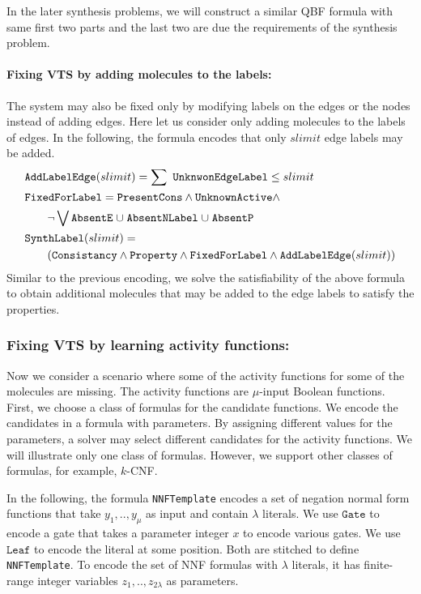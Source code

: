 In the later synthesis problems, we will construct a similar QBF
formula with same first two parts and the last two are due the
requirements of the synthesis problem.

\paragraph{\bf Fixing VTS by adding molecules to the labels:}
The system may also be fixed only by modifying labels on the edges or the nodes instead
of adding edges.
%
Here let us consider only adding molecules to the labels of edges.
%
In the following, the formula encodes that only $slimit$ edge labels may be added.
\begin{align*}
&\texttt{AddLabelEdge}(slimit) = 
\sum~\texttt{UnknwonEdgeLabel}  \leq slimit\\
& \texttt{FixedForLabel} = \texttt{PresentCons} \land \texttt{UnknownActive} \land\\
& \quad \quad \lnot \bigvee \texttt{AbsentE} \;{\cup}\;
\texttt{AbsentNLabel} \;{\cup}\;
\texttt{AbsentP}\\
&\texttt{SynthLabel}(slimit) = \\
& \quad\quad
(  \texttt{Consistancy}\land \texttt{Property} \land
\texttt{FixedForLabel} \land \texttt{AddLabelEdge}(slimit) )
\end{align*} 
Similar to the previous encoding, we solve the
satisfiability of the above formula to obtain additional molecules
that may be added to the edge labels to satisfy the properties.



\subsubsection{Fixing VTS by learning activity functions:}

Now we consider a scenario where some of the activity functions for
some of the molecules are missing.
%
The activity functions are $\mu$-input Boolean functions.
%
First, we choose a class of formulas for the candidate functions.
%
We encode the candidates in a formula with parameters.
%
By assigning different values for the parameters, a solver may select
different candidates for the activity functions.
%
We will illustrate only one class of formulas.
%
However, we support other classes of formulas, for example, $k$-CNF.

In the following, the formula \texttt{NNFTemplate} encodes a set of
negation normal form functions that take $y_1,..,y_\mu$ as input and
contain $\lambda$ literals.
%
We use $\texttt{Gate}$ to encode a gate that takes a parameter integer
$x$ to encode various gates.
%
We use $\texttt{Leaf} $ to encode the literal at some position.
%
Both are stitched to define \texttt{NNFTemplate}.
%
To encode the set of NNF formulas with $\lambda$ literals, it has
finite-range integer variables
$z_1,..,z_{2\lambda}$ as parameters.


